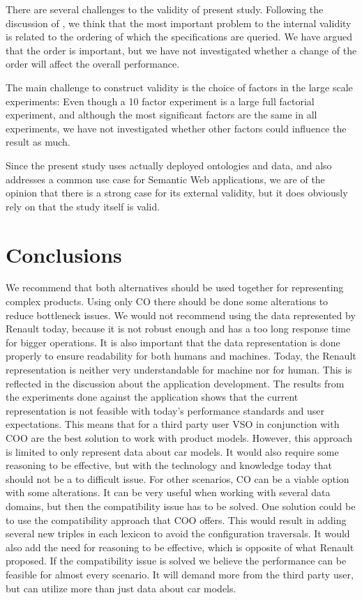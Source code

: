 \documentclass{llncs}
\begin{document}
There are several challenges to the validity of present
study. Following the discussion of \cite{publication-9417}, we
think that the most important problem to the internal validity is
related to the ordering of which the specifications are queried. We
have argued that the order is important, but we have not investigated
whether a change of the order will affect the overall performance.

The main challenge to construct validity is the choice of factors in
the large scale experiments: Even though a 10 factor experiment is a
large full factorial experiment, and although the most significant
factors are the same in all experiments, we have not investigated
whether other factors could influence the result as much.

Since the present study uses actually deployed ontologies and data,
and also addresses a common use case for Semantic Web applications, we
are of the opinion that there is a strong case for its external
validity, but it does obviously rely on that the study itself is
valid.

\section{Conclusions}

We recommend that both alternatives should be used together for
representing complex products. 
Using only CO there should be done some alterations to reduce
bottleneck issues. We would not recommend using the data represented
by Renault today, because it is not robust enough and has a too long
response time for bigger operations.  It is also important that the
data representation is done properly to ensure readability for both
humans and machines.  Today, the Renault representation is neither
very understandable for machine nor for human. This is reflected in
the discussion about the application development.  The results from
the experiments done against the application shows that the current
representation is not feasible with today's performance standards and
user expectations. This means that for a third party user VSO
in conjunction with COO are the best solution to work with product
models. However, this approach is limited to only represent data about
car models. It would also require some reasoning to be effective, but
with the technology and knowledge today that should not be a to
difficult issue. For other scenarios, CO can be a viable option with 
some alterations. It can be very useful when working with several
data domains, but then the compatibility issue has to be solved.  One
solution could be to use the compatibility approach that COO
offers. This would result in adding several new triples in each
lexicon to avoid the configuration traversals.  It would also add the
need for reasoning to be effective, which is opposite of what Renault
proposed. If the compatibility issue is solved we believe the
performance can be feasible for almost every scenario. It will demand
more from the third party user, but can utilize more than just data
about car models. 
\end{document}
